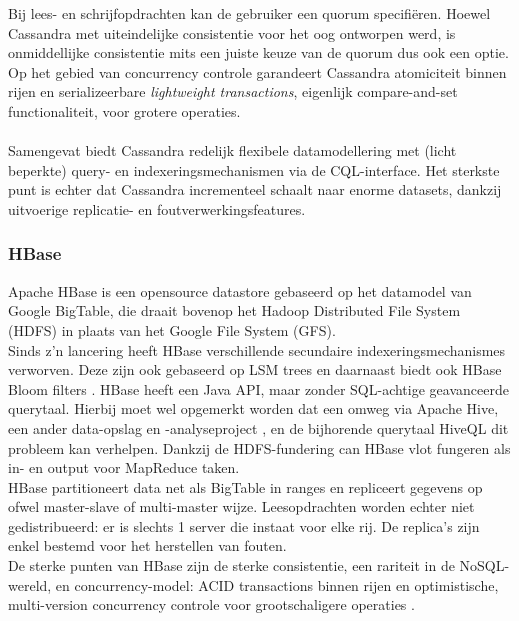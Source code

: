 Bij lees- en schrijfopdrachten kan de gebruiker een quorum specifi\"eren. Hoewel Cassandra met uiteindelijke consistentie voor het oog ontworpen werd, is onmiddellijke consistentie mits een juiste keuze van de quorum dus ook een optie.\\
Op het gebied van concurrency controle garandeert Cassandra atomiciteit binnen rijen en serializeerbare \textit{lightweight transactions}, eigenlijk compare-and-set functionaliteit, voor grotere operaties.
\\\\
Samengevat biedt Cassandra redelijk flexibele datamodellering met (licht beperkte) query- en indexeringsmechanismen via de CQL-interface. Het sterkste punt is echter dat Cassandra incrementeel schaalt naar enorme datasets, dankzij uitvoerige replicatie- en foutverwerkingsfeatures.

\subsubsection{HBase}

Apache HBase is een opensource datastore gebaseerd op het datamodel van Google BigTable, die draait bovenop het Hadoop Distributed File System (HDFS) in plaats van het Google File System (GFS).\\
Sinds z'n lancering heeft HBase verschillende secundaire indexeringsmechanismes verworven. Deze zijn ook gebaseerd op LSM trees en daarnaast biedt ook HBase Bloom filters \cite{borthakur2011apache}\cite{hbase_schema}. HBase heeft een Java API, maar zonder SQL-achtige geavanceerde querytaal. Hierbij moet wel opgemerkt worden dat een omweg via Apache Hive, een ander data-opslag en -analyseproject \cite{apache_hive}, en de bijhorende querytaal HiveQL dit probleem kan verhelpen. Dankzij de HDFS-fundering can HBase vlot fungeren als in- en output voor MapReduce taken.\\
HBase partitioneert data net als BigTable in ranges en repliceert gegevens op ofwel master-slave of multi-master wijze. Leesopdrachten worden echter niet gedistribueerd: er is slechts 1 server die instaat voor elke rij. De replica's zijn enkel bestemd voor het herstellen van fouten.\\
De sterke punten van HBase zijn de sterke consistentie, een rariteit in de NoSQL-wereld, en concurrency-model: ACID transactions binnen rijen en optimistische, multi-version concurrency controle voor grootschaligere operaties \cite{hbase_acid}\cite{grolinger2013data}\cite{borthakur2011apache}.\\

